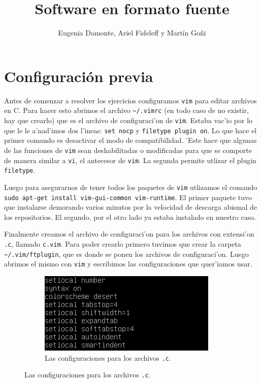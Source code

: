 \documentclass[11pt]{article}
\title{\Huge Software en formato fuente}
\author{Eugenia Damonte, Ariel Fideleff y Mart\'in Go\~ni}
\date{}
\begin{document}
	\maketitle
	\newpage
	\tableofcontents
	\newpage
	
	
	\section{Configuraci\'on previa}
		Antes de comenzar a resolver los ejercicios configuramos \texttt{vim} para editar archivos en C. Para hacer esto abrimos el archivo \texttt{\textasciitilde/.vimrc} (en todo caso de no existir, hay que crearlo) que es el archivo de configuraci'on de \texttt{vim}. Estaba vac'io por lo que le le a'nad'imos dos l'ineas: \texttt{set nocp} y \texttt{filetype plugin on}. Lo que hace el primer comando es desactivar el modo de compatibilidad. 'Este hace que algunas de las funciones de \texttt{vim} sean deshabilitadas o modificadas para que se comporte de manera similar a \texttt{vi}, el antecesor de \texttt{vim}. La segunda permite utlizar el plugin \texttt{filetype}.
		
		Luego para asegurarnos de tener todos los paquetes de \texttt{vim} utlizamos el comando \texttt{sudo apt-get install vim-gui-common vim-runtime}. El primer paquete tuvo que instalarse demorando varios minutos por la velocidad de descarga abismal de los repositorios. El segundo, por el otro lado ya estaba instalado en nuestro caso.
		
		Finalmente creamos el archivo de configuraci'on para los archivos con extensi'on \texttt{.c}, llamado \texttt{c.vim}. Para poder crearlo primero tuvimos que crear la carpeta \texttt{\textasciitilde/.vim/ftplugin}, que es donde se ponen los archivos de configuraci'on. Luego abrimos el mismo con \texttt{vim} y escribimos las configuraciones que quer'iamos usar.
		
		\begin{figure}[H]
			\centering
			\begin{subfigure}[b!]{0.7\linewidth}
				\includegraphics[width=\linewidth]{Images/Preamble/Preamble.PNG}
				\caption*{Las configuraciones para los archivos \texttt{.c}.}
			\end{subfigure}
		\end{figure}
		
\end{document}

